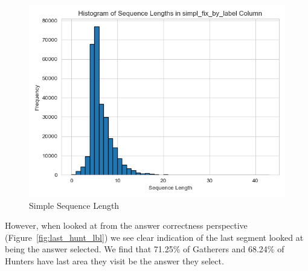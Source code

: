 \documentclass{article}
\begin{document}
    \begin{figure}[H]
        \centering
        \includegraphics[width=0.75\linewidth]{plots/sequence_freq/simpl_fix_by_label.png}
        \caption{Simple Sequence Length}
        \label{fig:length}
    \end{figure}

    However, when looked at from the answer correctness perspective (Figure~\ref{fig:last_hunt_lbl}) we see clear indication of the last segment looked at being the answer selected. We find that 71.25\% of Gatherers and 68.24\% of Hunters have last area they visit be the answer they select.
\end{document}
